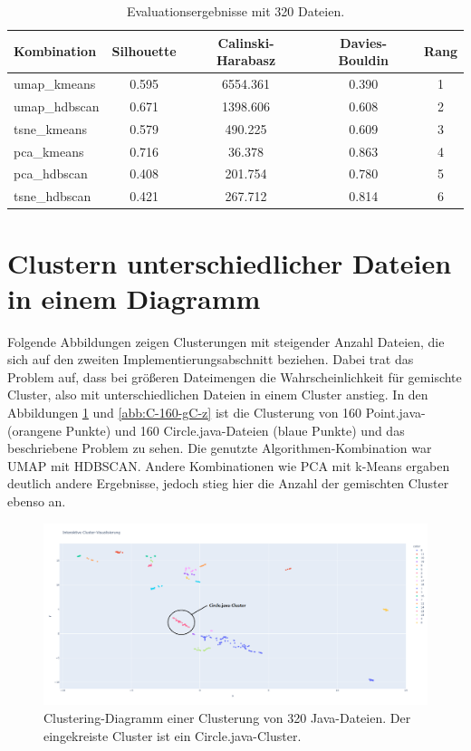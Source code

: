 \setlength{\tabcolsep}{5.5pt}
\begin{table}[h]
\centering
\begin{tabular}{lcccc}
\hline
\textbf{Kombination} & \textbf{Silhouette} & \textbf{Calinski-Harabasz} & \textbf{Davies-Bouldin} & \textbf{Rang} \\
\hline
umap\_kmeans    & 0.595 & 6554.361 & 0.390 & 1 \\
umap\_hdbscan   & 0.671 & 1398.606 & 0.608 & 2 \\
tsne\_kmeans    & 0.579 & 490.225  & 0.609 & 3 \\
pca\_kmeans     & 0.716 & 36.378   & 0.863 & 4 \\
pca\_hdbscan    & 0.408 & 201.754  & 0.780 & 5 \\
tsne\_hdbscan   & 0.421 & 267.712  & 0.814 & 6 \\
\hline
\end{tabular}
\caption{Evaluationsergebnisse mit 320 Dateien.}
\label{tab:EI-EV-160}
\end{table}


\section{Clustern unterschiedlicher Dateien in einem Diagramm}
\label{abs:C-u-D-i-e-D}
Folgende Abbildungen zeigen Clusterungen mit steigender Anzahl Dateien, die sich auf den zweiten Implementierungsabschnitt beziehen. Dabei trat das Problem auf, dass bei größeren Dateimengen die Wahrscheinlichkeit für gemischte Cluster, also mit unterschiedlichen Dateien in einem Cluster anstieg. In den Abbildungen \ref{abb:C-160-gC} und \ref{abb:C-160-gC-z} ist die Clusterung von 160 Point.java- (orangene Punkte) und 160 Circle.java-Dateien (blaue Punkte) und das beschriebene Problem zu sehen. Die genutzte Algorithmen-Kombination war UMAP mit HDBSCAN. Andere Kombinationen wie PCA mit k-Means ergaben deutlich andere Ergebnisse, jedoch stieg hier die Anzahl der gemischten Cluster ebenso an.

\begin{figure} %
	\centering
	\includegraphics[width=1.0\textwidth]{images/Clusterung - 160 - gemischte Cluster.pdf}
	\caption{Clustering-Diagramm einer Clusterung von 320 Java-Dateien. Der eingekreiste Cluster ist ein Circle.java-Cluster.}
	\label{abb:C-160-gC}
\end{figure}

